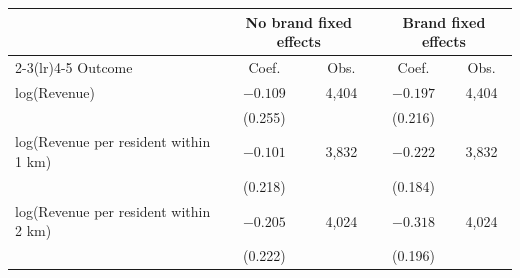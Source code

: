 \begin{tabular}{@{}lcccc@{}}
\toprule
 & \multicolumn{2}{c}{No brand fixed effects} & \multicolumn{2}{c}{Brand fixed effects} \\
\cmidrule(lr){2-3}\cmidrule(lr){4-5}
Outcome & Coef. & Obs. & Coef. & Obs. \\
\midrule
log(Revenue) & $-0.109$ & 4,404 & $-0.197$ & 4,404 \\
 & (0.255) &  & (0.216) &  \\
log(Revenue per resident within 1 km) & $-0.101$ & 3,832 & $-0.222$ & 3,832 \\
 & (0.218) &  & (0.184) &  \\
log(Revenue per resident within 2 km) & $-0.205$ & 4,024 & $-0.318$ & 4,024 \\
 & (0.222) &  & (0.196) &  \\
\bottomrule
\end{tabular}
